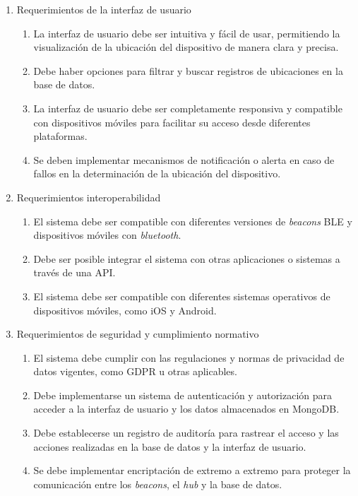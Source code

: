 \documentclass[
11pt, %
]{charter}
\begin{document}
\begin{enumerate}
\begin{enumerate}
		\end{enumerate}
	\item Requerimientos de la interfaz de usuario
		\begin{enumerate}
			\item La interfaz de usuario debe ser intuitiva y fácil de usar, permitiendo la visualización de la ubicación del dispositivo de manera clara y precisa.
			\item Debe haber opciones para filtrar y buscar registros de ubicaciones en la base de datos.
			\item La interfaz de usuario debe ser completamente responsiva y compatible con dispositivos móviles para facilitar su acceso desde diferentes plataformas.
			\item Se deben implementar mecanismos de notificación o alerta en caso de fallos en la determinación de la ubicación del dispositivo.
		\end{enumerate}
	\item Requerimientos interoperabilidad
		\begin{enumerate}
			\item El sistema debe ser compatible con diferentes versiones de \textit{beacons} BLE y dispositivos móviles con \textit{bluetooth}.
			\item Debe ser posible integrar el sistema con otras aplicaciones o sistemas a través de una API.
			\item El sistema debe ser compatible con diferentes sistemas operativos de dispositivos móviles, como iOS y Android.
		\end{enumerate}
	\item Requerimientos de seguridad y cumplimiento normativo
		\begin{enumerate}
			\item El sistema debe cumplir con las regulaciones y normas de privacidad de datos vigentes, como GDPR u otras aplicables.
			\item Debe implementarse un sistema de autenticación y autorización para acceder a la interfaz de usuario y los datos almacenados en MongoDB.
			\item Debe establecerse un registro de auditoría para rastrear el acceso y las acciones realizadas en la base de datos y la interfaz de usuario.
			\item Se debe implementar encriptación de extremo a extremo para proteger la comunicación entre los \textit{beacons}, el \textit{hub} y la base de datos.
		\end{enumerate}
\end{enumerate}
\end{document}
